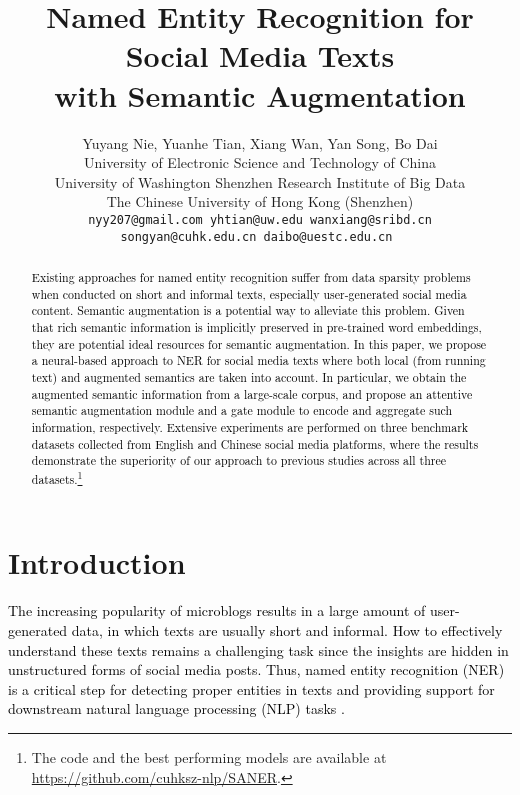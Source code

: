 \documentclass[11pt,a4paper]{article}
\title{Named Entity Recognition for Social Media Texts \\
with Semantic Augmentation
}
\author{
    Yuyang Nie, \hspace{0.1cm}
    Yuanhe Tian, \hspace{0.1cm}
    Xiang Wan, \hspace{0.1cm}
    Yan Song, \hspace{0.1cm}
    Bo Dai \\
University of Electronic Science and Technology of China\\
    University of Washington \hspace{0.1cm} Shenzhen Research Institute of Big Data\\
    The Chinese University of Hong Kong (Shenzhen)\\
    \tt  nyy207@gmail.com \hspace{0.1cm} yhtian@uw.edu \hspace{0.1cm} wanxiang@sribd.cn\\
    \tt songyan@cuhk.edu.cn \hspace{0.1cm} daibo@uestc.edu.cn
}
\date{}
\begin{document}
\maketitle

\def\thefootnote{*}
\def\thefootnote{\dag}

\def\thefootnote{\arabic{footnote}}



\begin{abstract}
\textcolor{black}{
Existing approaches for named entity recognition suffer from data sparsity problems when conducted on short and informal texts, especially user-generated social media content.
Semantic augmentation is a potential way to alleviate this problem.
Given that rich semantic information is implicitly preserved in pre-trained word embeddings, they are potential ideal resources for semantic augmentation.
In this paper, we propose a neural-based approach to NER for social media texts where both local (from running text) and augmented semantics are taken into account.
In particular, we obtain the augmented semantic information from a large-scale corpus, and propose an 
attentive semantic
augmentation module and a gate module to encode and aggregate such information, respectively.
Extensive experiments are performed on three benchmark datasets collected from English and Chinese social media platforms,
where the results demonstrate the superiority of our approach to previous studies across all three datasets.\footnote{The code and the best performing models are available at \url{https://github.com/cuhksz-nlp/SANER}.}
}

\end{abstract}

\section{Introduction}

\textcolor{black}{
The increasing popularity of microblogs results in a large amount of user-generated data, in which texts are usually short and informal.
How to effectively understand these texts remains a challenging task since the insights are hidden in unstructured forms of social media posts.
Thus, named entity recognition (NER) is a critical step for detecting proper entities in texts and providing support for downstream natural language processing (NLP) tasks \cite{DBLP:conf/aaai/PangLGXSC19,DBLP:conf/acl/MartinsMM19}.
}
\end{document}
